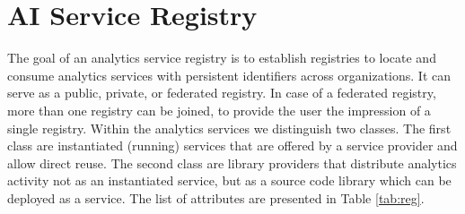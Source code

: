 \documentclass[12pt]{article}
\begin{document}
\section{AI Service Registry} 

The goal of an analytics service registry is to establish registries to locate and consume analytics services 
with persistent identifiers across organizations.  It can serve as a public, private, or federated registry. In case of a federated registry, more than one registry can be joined, to provide the user the impression of a single registry.
Within the analytics services we distinguish two classes. The first class are instantiated (running) services that are offered by a service provider and allow direct reuse. The second class are library providers that distribute analytics activity not as an instantiated service, but as a source code library which can be deployed as a service. The list of attributes are presented in Table \ref{tab:reg}.
\end{document}
